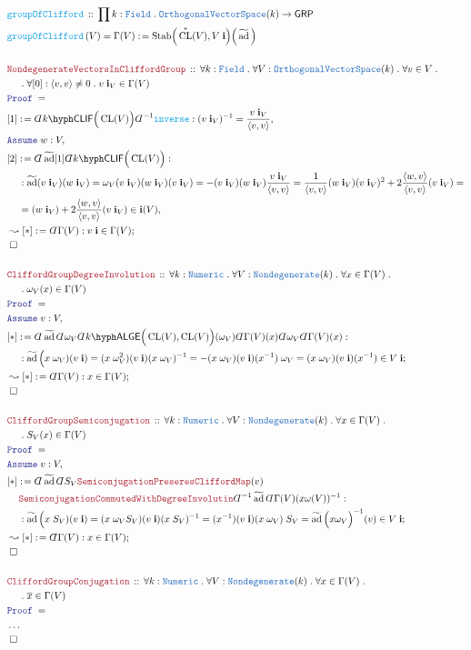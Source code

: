 \documentclass[12pt]{scrartcl}%
\newcommand{\TYPE}[1]{\textcolor{NavyBlue}{\mathtt{#1}}}%
\newcommand{\FUNC}[1]{\textcolor{Cerulean}{\mathtt{#1}}}%
\newcommand{\LOGIC}[1]{\textcolor{Blue}{\mathtt{#1}}}%
\newcommand{\THM}[1]{\textcolor{Maroon}{\mathtt{#1}}}%
\renewcommand{\.}{\; . \;} %
\newcommand{\de}{: \kern 0.1pc =} %
\newcommand{\Act}[1]{\left( #1 \right)} %
\newcommand{\Theorem}[2]{& \THM{#1} \, :: \, #2 \\ & \Proof = \\ } %
\newcommand{\DeclareFunc}[2]{& \FUNC{#1} \, :: \, #2 \\}%
\newcommand{\DefineNamedFunc}[4]{&  \FUNC{#1}\Act{#2} = #3 \de #4 \\}%
\newcommand{\NewLine}{\\ & \kern 1pc}%
\newcommand{\Page}[1]{ \begin{align*} #1 \end{align*}  }%
\newcommand{ \bd }{ \ByDef }%
\newcommand{\NoProof}{ & \ldots \\ \EndProof}%
\newcommand{\Say}[3]{& #1 \de #2 : #3, \\} %
\newcommand{\Conclude}[3]{& #1 \de #2 : #3; \\}%
\newcommand{\DeriveConclude}[3]{& \leadsto #1 \de #2 : #3 ; \\} %
\newcommand{\Assume}[2]{& \LOGIC{Assume} \; #1 : #2, \\} %
\newcommand{\QED}{\; \square} %
\newcommand{\EndProof}{& \QED \\} %
\newcommand{\ByDef}{\rotatebox[origin=c]{-180}{$D$}}%
\newcommand{\Proof}{\LOGIC{Proof} \; } %
\newcommand{\GRP}{\mathsf{GRP}} %
\newcommand{\OVS}{\TYPE{OrthogonalVectorSpace}}
\newcommand{\Field}{\TYPE{Field}}
\newcommand{\LALGE}[1]{#1\hyph\mathsf{ALGE}}%
\newcommand{\CLIF}[1]{#1\hyph\mathsf{CLIF}}%
\DeclareMathOperator{\CL}{CL}%
\DeclareMathOperator{\tad}{\widetilde{ad}}%
\begin{document}
\Page{
	\DeclareFunc{groupOfClifford}
	{ 
		\prod k : \Field \. 
		\OVS(k) \to \GRP 
	}
	\DefineNamedFunc{groupOfClifford}
	{V}{ \Gamma(V) }{ \mathrm{Stab}\Big( \CL^*(V) ,V \; \mathbf{i}\Big)
		\Big(\tad\Big) } 
	\\
	\Theorem{NondegenerateVectorsInCliffordGroup}
	{
		\forall k : \Field \.
		\forall V : \OVS(k) \.
		\forall v \in V \. \NewLine  \.
		\forall [0] : \langle v, v \rangle \neq 0  \.
		v \; \mathbf{i}_V \in \Gamma(V)	
	}
	\Say{[1]}{\bd \CLIF{k}\Big(\CL(V)\Big)\bd^{-1} \FUNC{inverse} }
	{
		(v \; \mathbf{i}_V)^{-1} = 
		\frac{v \; \mathbf{i}_V}{ \langle v,v \rangle  }
	}
	\Assume{w}{V}
	\Say{[2]}{ \bd \tad [1] \bd \CLIF{k}\Big(\CL(V)\Big)    }
	{
		\NewLine :
		\tad(v \; \mathbf{i}_V)(w \; \mathbf{i}_V) =
		\omega_V(v \; \mathbf{i}_V)(w \; \mathbf{i}_V)(v \; \mathbf{i}_V) =
		-(v \; \mathbf{i}_V)(w \; \mathbf{i}_V)
		\frac{v \; \mathbf{i}_V}{\langle v, v \rangle} =
		\frac{1}{\langle v, v\rangle}
		(w \; \mathbf{i}_V)(v \; \mathbf{i}_V)^2 +
		2\frac{\langle w, v \rangle}{\langle v, v \rangle} 
		(v \; \mathbf{i}_V)   =   \NewLine =       
		(w \; \mathbf{i}_V) +
		2\frac{\langle w, v \rangle}{\langle v, v \rangle} 
		(v \; \mathbf{i}_V)   \in \mathbf{i}(V)          
	}
	\DeriveConclude{[*]}{\bd \Gamma(V)}{ v \; \mathbf{i} \in \Gamma(V)}
	\EndProof
	\\
	\Theorem{CliffordGroupDegreeInvolution}
	{
		\forall k : \TYPE{Numeric} \. 
		\forall V : \TYPE{Nondegenerate}(k) \.
		\forall x \in \Gamma(V) \. \NewLine \.
		\omega_V(x) \in  \Gamma(V)  
	}
	\Assume{v}{V}
	\Conclude{[*]}
	{
		\bd \tad 
		\bd \omega_V 
		\bd \LALGE{k}\Big(\CL(V),\CL(V)\Big)(\omega_V)
		\bd \Gamma(V)(x) 
		\bd \omega_V 
		\bd \Gamma(V)(x)
	}
	{
		\NewLine :
		\tad\Big( x \; \omega_V)(v \; \mathbf{i}) =
		( x \; \omega_V^2)(v \; \mathbf{i})( x \; \omega_V  )^{-1} =
		-( x \; \omega_V)(v \; \mathbf{i})(x^{-1}) \; \omega_V =
		(x \; \omega_V)(v \;  \mathbf{i})(x^{-1}) \in V \; \mathbf{i}
	}
	\DeriveConclude{[*]}{\bd \Gamma(V)}{ x \in \Gamma(V)}
	\EndProof
	\\
	\Theorem{CliffordGroupSemiconjugation}
	{
		\forall k : \TYPE{Numeric} \. 
		\forall V : \TYPE{Nondegenerate}(k) \.
		\forall x \in \Gamma(V) \. \NewLine \.
		S_V(x) \in  \Gamma(V)  
	}
	\Assume{v}{V}
	\Conclude{[*]}
	{
		\bd \tad 
		\bd S_V
		\THM{SemiconjugationPreseresCliffordMap}(v) \NewLine
		\THM{SemiconjugationCommutedWithDegreeInvolutin}
		\bd^{-1} \tad
		\bd \Gamma(V)(x \omega(V))^{-1}
	}
	{
		\NewLine :
		\tad\Big( x \; S_V)(v \; \mathbf{i}) =
		( x \; \omega_V S_V)(v \; \mathbf{i})( x \; S_V  )^{-1} =
		( x^{-1} )(v \; \mathbf{i})(x \; \omega_V) \; S_V =
		\tad\Big( x \omega_V  \Big)^{-1}(v)   \in V \; \mathbf{i}
	}
	\DeriveConclude{[*]}{\bd \Gamma(V)}{ x \in \Gamma(V)}
	\EndProof
	\\
	\Theorem{CliffordGroupConjugation}
	{
		\forall k : \TYPE{Numeric} \. 
		\forall V : \TYPE{Nondegenerate}(k) \.
		\forall x \in \Gamma(V) \. \NewLine \.
		\overline{x} \in  \Gamma(V)  
	}
	\NoProof
}
\end{document}
